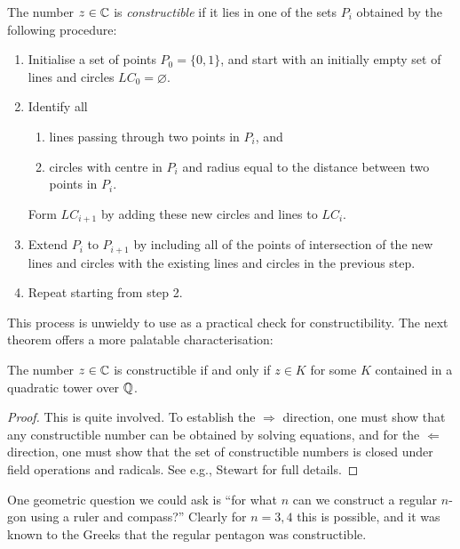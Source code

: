 \begin{definition}
   The number $z \in \mathbb{{C}}$ is \emph{constructible} if it lies in one of the sets $P_i$ obtained by the following procedure:
    \begin{enumerate}
        \item Initialise a set of points $P_0 = \{0, 1\}$, and start with an initially empty set of lines and circles $LC_0 = \varnothing$.

        \item Identify all
        \begin{enumerate}
            \item lines passing through two points in $P_i$, and
            \item circles with centre in $P_i$ and radius equal to the distance between two points in $P_i$.
        \end{enumerate}
        Form $LC_{i + 1}$ by adding these new circles and lines to $LC_i$.

        \item Extend $P_i$ to $P_{i + 1}$ by including all of the points of intersection of the new lines and circles with the existing lines and circles in the previous step.

        \item Repeat starting from step 2.
    \end{enumerate}
\end{definition}

This process is unwieldy to use as a practical check for constructibility. The next theorem offers a more palatable characterisation:

\begin{theorem}
\label{thm_constructible_iff_in_quadratic_tower}
    The number $z \in \mathbb{{C}}$ is constructible if and only if $z \in K$ for some $K$ contained in a quadratic tower over $\mathbb{{Q}}$.
\end{theorem}

\begin{proof}
    This is quite involved. To establish the $\Rightarrow$ direction, one must show that any constructible number can be obtained by solving equations, and for the $\Leftarrow$ direction, one must show that the set of constructible numbers is closed under field operations and radicals. See e.g., Stewart for full details.
\end{proof}

One geometric question we could ask is ``for what $n$ can we construct a regular $n$-gon using a ruler and compass?'' Clearly for $n = 3, 4$ this is possible, and it was known to the Greeks that the regular pentagon was constructible.

